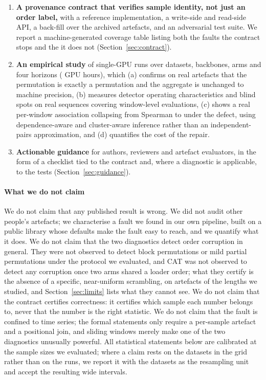\documentclass[a4paper,fleqn]{cas-sc}
\begin{document}
\begin{enumerate}
\item \textbf{A provenance contract that verifies sample identity, not just an
order label,} with a reference implementation, a write-side and read-side API, a
back-fill over the archived artefacts, and an adversarial test suite. We report a
machine-generated coverage table listing both the \NumContractDetected{} faults
the contract stops and the \NumContractUndetected{} it does not
(Section~\ref{sec:contract}).
\item \textbf{An empirical study} of \NumRuns{} single-GPU runs over
\NumDatasets{} datasets, \NumBackbones{} backbones, \NumArms{} arms and four
horizons (\NumGpuHours{} GPU hours), which (a) confirms on real artefacts that the
permutation is exactly a permutation and the aggregate is unchanged to machine
precision, (b) measures detector operating characteristics and blind spots on
\NumSequences{} real sequences covering \NumWindowsAudited{} window-level
evaluations, (c) shows a
real per-window association collapsing from Spearman
\NumTaskOneRhoIndexMedian{} to \NumTaskOneRhoDefectMedian{} under the defect,
using dependence-aware and cluster-aware inference rather than an
independent-pairs approximation, and (d) quantifies the cost of the repair.
\item \textbf{Actionable guidance} for authors, reviewers and artefact
evaluators, in the form of a checklist tied to the contract and, where a
diagnostic is applicable, to the tests
(Section~\ref{sec:guidance}).
\end{enumerate}

\paragraph{What we do not claim}
We do not claim that any published result is wrong. We did not audit other
people's artefacts; we characterise a fault we found in our own pipeline, built on
a public library whose defaults make the fault easy to reach, and we quantify what
it does. We do not claim that the two diagnostics detect order corruption in
general. They were not observed to detect block permutations or mild partial
permutations under the protocol we evaluated, and CAT was not observed to detect
any corruption once two arms shared a loader order; what they certify is the
absence of a specific, near-uniform scrambling, on artefacts of the lengths we
studied, and Section~\ref{sec:limits} lists what they cannot see. We do not claim
that the contract certifies correctness: it certifies which sample each number
belongs to, never that the number is the right statistic. We do not claim that the
fault is confined to time series; the
formal statements only require a per-sample artefact and a positional join, and
sliding windows merely make one of the two diagnostics unusually powerful. All
statistical statements below are calibrated at the sample sizes we evaluated;
where a claim rests on the \NumDepDatasets{} datasets in the grid rather than on
the \NumDepCells{} runs, we report it with the datasets as the resampling unit and
accept the resulting wide intervals.
\end{document}
